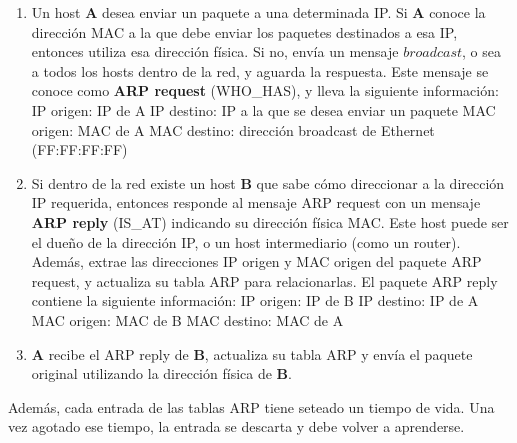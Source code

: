 \begin{enumerate}
	\item Un host \textbf{A} desea enviar un paquete a una determinada IP. Si \textbf{A} conoce la dirección MAC a la que debe enviar los paquetes destinados a esa IP, entonces utiliza esa dirección física. Si no, envía un mensaje $broadcast$, o sea a todos los hosts dentro de la red, y aguarda la respuesta. Este mensaje se conoce como \textbf{ARP request} (WHO\_HAS), y lleva la siguiente información:
		\subitem IP origen: IP de A
		\subitem IP destino: IP a la que se desea enviar un paquete
		\subitem MAC origen: MAC de A
		\subitem MAC destino: dirección broadcast de Ethernet (FF:FF:FF:FF)
	\item Si dentro de la red existe un host \textbf{B} que sabe cómo direccionar a la dirección IP requerida, entonces responde al mensaje ARP request con un mensaje \textbf{ARP reply} (IS\_AT) indicando su dirección física MAC. Este host puede ser el dueño de la dirección IP, o un host intermediario (como un router). Además, extrae las direcciones IP origen y MAC origen del paquete ARP request, y actualiza su tabla ARP para relacionarlas.
	El paquete ARP reply contiene la siguiente información:
		\subitem IP origen: IP de B
		\subitem IP destino: IP de A
		\subitem MAC origen: MAC de B
		\subitem MAC destino: MAC de A
	\item \textbf{A} recibe el ARP reply de \textbf{B}, actualiza su tabla ARP y envía el paquete original utilizando la dirección física de \textbf{B}.
\end{enumerate}
Además, cada entrada de las tablas ARP tiene seteado un tiempo de vida. Una vez agotado ese tiempo, la entrada se descarta y debe volver a aprenderse. 


